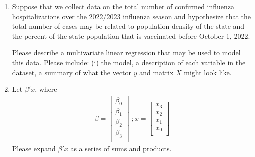 \begin{enumerate}
    \item Suppose that we collect data on the total number of confirmed influenza hospitalizations over the 2022/2023 influenza season and hypothesize that the total number of cases may be related to population density of the state and the percent of the state population that is vaccinated before October 1, 2022.
    
    Please describe a multivariate linear regression that may be used to model this data. Please include: (i) the model, a description of each variable in the dataset, a summary of what the vector $y$ and matrix $X$ might look like.
    
    \item Let $\beta' x$, where 
    \begin{align*}
        \beta = \begin{bmatrix}
                    \beta_{0}\\
                    \beta_{1}\\
                    \beta_{2}\\
                    \beta_{3}\\
                 \end{bmatrix}\; ; 
                 x   = \begin{bmatrix}
                    x_{3}\\
                    x_{2}\\
                    x_{1}\\
                    x_{0}\\
                 \end{bmatrix}
    \end{align*}
    Please expand $\beta'x$ as a series of sums and products.
    
    
\end{enumerate}






